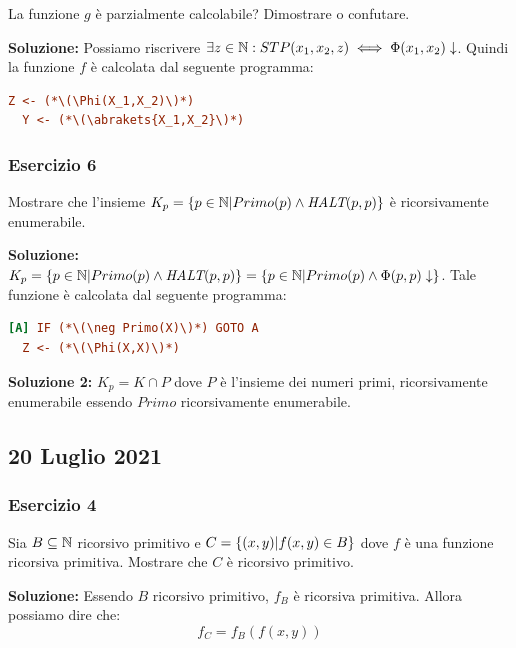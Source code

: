 La funzione \(g\) è parzialmente calcolabile? Dimostrare o confutare.

\textbf{Soluzione: } Possiamo riscrivere \(\exists z \in \mathbb{N}: STP(x_1,x_2,z) \iff \Phi(x_1,x_2)\downarrow\). Quindi la funzione \(f\) è calcolata dal seguente programma:

\begin{lstlisting}[language=ini, caption={ }]
  Z <- (*\(\Phi(X_1,X_2)\)*)
  Y <- (*\(\abrakets{X_1,X_2}\)*)
\end{lstlisting}


\subsubsection{Esercizio 6}

Mostrare che l'insieme \(K_p=\displaystyle{\left\{{p \in \mathbb{N}\vert Primo(p) \land \textit{HALT}(p,p) }\right\}}\) è ricorsivamente enumerabile.

\textbf{Soluzione: } \(K_p=\displaystyle{\left\{{p \in \mathbb{N}\vert Primo(p) \land \textit{HALT}(p,p) }\right\}}=\displaystyle{\left\{{p \in \mathbb{N}\vert Primo(p) \land \Phi(p,p) \downarrow}\right\}}\). Tale funzione è calcolata dal seguente programma:

\begin{lstlisting}[language=ini, caption={ }]
[A] IF (*\(\neg Primo(X)\)*) GOTO A
  Z <- (*\(\Phi(X,X)\)*)
\end{lstlisting}

\textbf{Soluzione 2: } \(K_p=K \cap P\) dove \(P\) è l'insieme dei numeri primi, ricorsivamente enumerabile essendo \(Primo\) ricorsivamente enumerabile.

\subsection{20 Luglio 2021}

\subsubsection{Esercizio 4}

Sia \(B\subseteq \mathbb{N}\) ricorsivo primitivo e \(C=\displaystyle{\left\{{(x,y) \vert f(x,y) \in B}\right\}}\) dove \(f\) è una funzione ricorsiva primitiva. Mostrare che \(C\) è ricorsivo primitivo.

\textbf{Soluzione: } Essendo \(B\) ricorsivo primitivo, \(f_B\) è ricorsiva primitiva. Allora possiamo dire che:
\begin{equation}
  f_C=f_B(f(x,y))
\end{equation}

